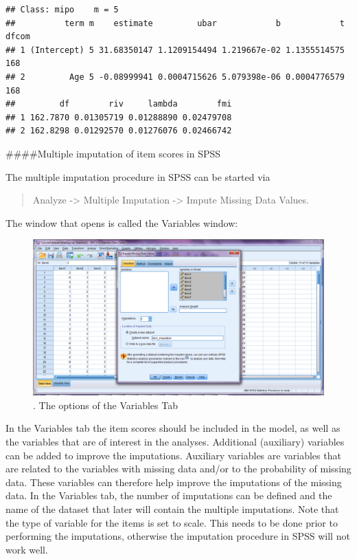 \documentclass[
]{book}
\begin{document}
\begin{verbatim}
## Class: mipo    m = 5 
##          term m    estimate         ubar            b            t dfcom
## 1 (Intercept) 5 31.68350147 1.1209154494 1.219667e-02 1.1355514575   168
## 2         Age 5 -0.08999941 0.0004715626 5.079398e-06 0.0004776579   168
##         df        riv     lambda        fmi
## 1 162.7870 0.01305719 0.01288890 0.02479708
## 2 162.8298 0.01292570 0.01276076 0.02466742
\end{verbatim}

\#\#\#\#Multiple imputation of item scores in SPSS

The multiple imputation procedure in SPSS can be started via

\begin{quote}
Analyze -\textgreater{} Multiple Imputation -\textgreater{} Impute
Missing Data Values.
\end{quote}

The window that opens is called the Variables window:

\begin{figure}

{\centering \includegraphics[width=0.9\linewidth]{images/fig8.1} 

}

\caption{. The options of the Variables Tab}\label{fig:fig8-1}
\end{figure}

In the Variables tab the item scores should be included in the model, as
well as the variables that are of interest in the analyses. Additional
(auxiliary) variables can be added to improve the imputations. Auxiliary
variables are variables that are related to the variables with missing
data and/or to the probability of missing data. These variables can
therefore help improve the imputations of the missing data. In the
Variables tab, the number of imputations can be defined and the name of
the dataset that later will contain the multiple imputations. Note that
the type of variable for the items is set to scale. This needs to be
done prior to performing the imputations, otherwise the imputation
procedure in SPSS will not work well.
\end{document}
